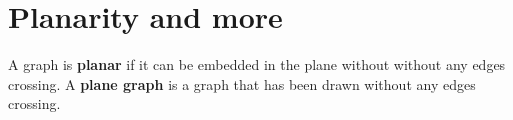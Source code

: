 \chapter{Planarity and more}
A graph is \textbf{planar} if it can be embedded in the plane without without any edges crossing.\newline
A \textbf{plane graph} is a graph that has been drawn without any edges crossing.\newline
\begin{figure}[!ht]
	\centering
\end{figure}

